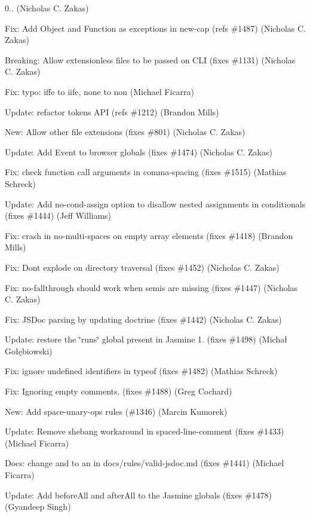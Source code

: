 \begin{DoxyItemize}
\item 0.. (Nicholas C. Zakas)
\item Fix\+: Add Object and Function as exceptions in new-\/cap (refs \#1487) (Nicholas C. Zakas)
\item Breaking\+: Allow extensionless files to be passed on C\+LI (fixes \#1131) (Nicholas C. Zakas)
\item Fix\+: typo\+: iffe to iife, none to non (Michael Ficarra)
\item Update\+: refactor tokens A\+PI (refs \#1212) (Brandon Mills)
\item New\+: Allow other file extensions (fixes \#801) (Nicholas C. Zakas)
\item Update\+: Add Event to browser globals (fixes \#1474) (Nicholas C. Zakas)
\item Fix\+: check function call arguments in comma-\/spacing (fixes \#1515) (Mathias Schreck)
\item Update\+: Add no-\/cond-\/assign option to disallow nested assignments in conditionals (fixes \#1444) (Jeff Williams)
\item Fix\+: crash in no-\/multi-\/spaces on empty array elements (fixes \#1418) (Brandon Mills)
\item Fix\+: Don\textquotesingle{}t explode on directory traversal (fixes \#1452) (Nicholas C. Zakas)
\item Fix\+: no-\/fallthrough should work when semis are missing (fixes \#1447) (Nicholas C. Zakas)
\item Fix\+: J\+S\+Doc parsing by updating doctrine (fixes \#1442) (Nicholas C. Zakas)
\item Update\+: restore the \char`\"{}runs\char`\"{} global present in Jasmine 1. (fixes \#1498) (Michał Gołębiowski)
\item Fix\+: ignore undefined identifiers in typeof (fixes \#1482) (Mathias Schreck)
\item Fix\+: Ignoring empty comments. (fixes \#1488) (Greg Cochard)
\item New\+: Add space-\/unary-\/ops rules (\#1346) (Marcin Kumorek)
\item Update\+: Remove shebang workaround in spaced-\/line-\/comment (fixes \#1433) (Michael Ficarra)
\item Docs\+: change \textquotesingle{}and\textquotesingle{} to \textquotesingle{}an\textquotesingle{} in docs/rules/valid-\/jsdoc.\+md (fixes \#1441) (Michael Ficarra)
\item Update\+: Add {\ttfamily before\+All} and {\ttfamily after\+All} to the Jasmine globals (fixes \#1478) (Gyandeep Singh)

\end{DoxyItemize}
